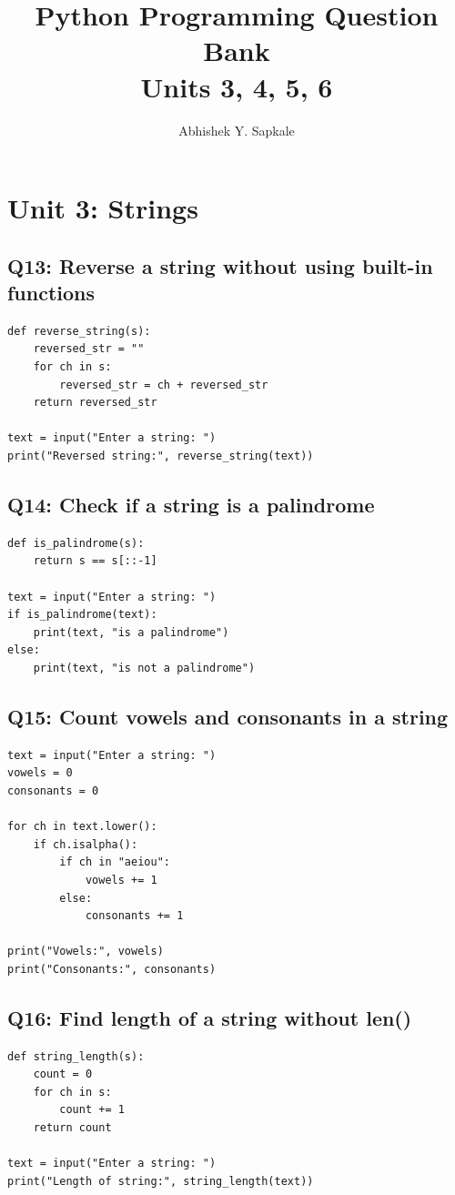 \documentclass[11pt,a4paper]{article}
\title{Python Programming Question Bank \\ Units 3, 4, 5, 6}
\author{Abhishek Y. Sapkale}
\date{}
\begin{document}
\maketitle
\tableofcontents
\newpage

\section{Unit 3: Strings}

\subsection{Q13: Reverse a string without using built-in functions}
\begin{lstlisting}
def reverse_string(s):
    reversed_str = ""
    for ch in s:
        reversed_str = ch + reversed_str
    return reversed_str

text = input("Enter a string: ")
print("Reversed string:", reverse_string(text))
\end{lstlisting}

\subsection{Q14: Check if a string is a palindrome}
\begin{lstlisting}
def is_palindrome(s):
    return s == s[::-1]

text = input("Enter a string: ")
if is_palindrome(text):
    print(text, "is a palindrome")
else:
    print(text, "is not a palindrome")
\end{lstlisting}

\subsection{Q15: Count vowels and consonants in a string}
\begin{lstlisting}
text = input("Enter a string: ")
vowels = 0
consonants = 0

for ch in text.lower():
    if ch.isalpha():
        if ch in "aeiou":
            vowels += 1
        else:
            consonants += 1

print("Vowels:", vowels)
print("Consonants:", consonants)
\end{lstlisting}

\subsection{Q16: Find length of a string without len()}
\begin{lstlisting}
def string_length(s):
    count = 0
    for ch in s:
        count += 1
    return count

text = input("Enter a string: ")
print("Length of string:", string_length(text))
\end{lstlisting}
\end{document}
